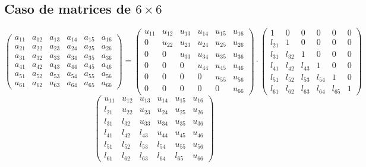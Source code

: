 \documentclass[10pt,a4paper,dvipdfmx]{article}
\begin{document}
\subsection{Caso de matrices de $6\times 6$ }
$$ \left( 
\begin{array}{cccccc}
a_{{1}{1}} & a_{{1}{2}} & a_{{1}{3}} & a_{{1}{4}} & a_{{1}{5}} & a_{{1}{6}} \\
a_{{2}{1}} & a_{{2}{2}} & a_{{2}{3}} & a_{{2}{4}} & a_{{2}{5}} & a_{{2}{6}} \\
a_{{3}{1}} & a_{{3}{2}} & a_{{3}{3}} & a_{{3}{4}} & a_{{3}{5}} & a_{{3}{6}} \\
a_{{4}{1}} & a_{{4}{2}} & a_{{4}{3}} & a_{{4}{4}} & a_{{4}{5}} & a_{{4}{6}} \\
a_{{5}{1}} & a_{{5}{2}} & a_{{5}{3}} & a_{{5}{4}} & a_{{5}{5}} & a_{{5}{6}} \\
a_{{6}{1}} & a_{{6}{2}} & a_{{6}{3}} & a_{{6}{4}} & a_{{6}{5}} & a_{{6}{6}} 
 \end{array}
\right)
 = \left( 
\begin{array}{cccccc}
u_{{1}{1}} & u_{{1}{2}} & u_{{1}{3}} & u_{{1}{4}} & u_{{1}{5}} & u_{{1}{6}} \\
0 & u_{{2}{2}} & u_{{2}{3}} & u_{{2}{4}} & u_{{2}{5}} & u_{{2}{6}} \\
0 & 0 & u_{{3}{3}} & u_{{3}{4}} & u_{{3}{5}} & u_{{3}{6}} \\
0 & 0 & 0 & u_{{4}{4}} & u_{{4}{5}} & u_{{4}{6}} \\
0 & 0 & 0 & 0 & u_{{5}{5}} & u_{{5}{6}} \\
0 & 0 & 0 & 0 & 0 & u_{{6}{6}} 
 \end{array}
\right)
 \cdot \left( 
\begin{array}{cccccc}
1 & 0 & 0 & 0 & 0 & 0 \\
l_{{2}{1}} & 1 & 0 & 0 & 0 & 0 \\
l_{{3}{1}} & l_{{3}{2}} & 1 & 0 & 0 & 0 \\
l_{{4}{1}} & l_{{4}{2}} & l_{{4}{3}} & 1 & 0 & 0 \\
l_{{5}{1}} & l_{{5}{2}} & l_{{5}{3}} & l_{{5}{4}} & 1 & 0 \\
l_{{6}{1}} & l_{{6}{2}} & l_{{6}{3}} & l_{{6}{4}} & l_{{6}{5}} & 1 
 \end{array}
\right)
 $$
$$ \left( 
\begin{array}{cccccc}
u_{{1}{1}} & u_{{1}{2}} & u_{{1}{3}} & u_{{1}{4}} & u_{{1}{5}} & u_{{1}{6}} \\
l_{{2}{1}} & u_{{2}{2}} & u_{{2}{3}} & u_{{2}{4}} & u_{{2}{5}} & u_{{2}{6}} \\
l_{{3}{1}} & l_{{3}{2}} & u_{{3}{3}} & u_{{3}{4}} & u_{{3}{5}} & u_{{3}{6}} \\
l_{{4}{1}} & l_{{4}{2}} & l_{{4}{3}} & u_{{4}{4}} & u_{{4}{5}} & u_{{4}{6}} \\
l_{{5}{1}} & l_{{5}{2}} & l_{{5}{3}} & l_{{5}{4}} & u_{{5}{5}} & u_{{5}{6}} \\
l_{{6}{1}} & l_{{6}{2}} & l_{{6}{3}} & l_{{6}{4}} & l_{{6}{5}} & u_{{6}{6}} 
 \end{array}
\right)
 $$
\end{document}
